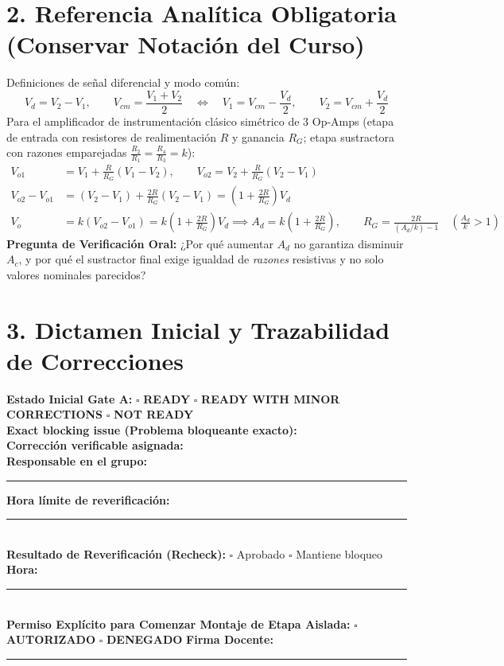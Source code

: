 \documentclass[10pt, a4paper]{article}
\begin{document}
\section*{2. Referencia Analítica Obligatoria (Conservar Notación del Curso)}
Definiciones de señal diferencial y modo común:
\begin{equation*}
    V_d = V_2 - V_1, \qquad V_{cm} = \frac{V_1 + V_2}{2} \quad \Longleftrightarrow \quad V_1 = V_{cm} - \frac{V_d}{2}, \qquad V_2 = V_{cm} + \frac{V_d}{2}
\end{equation*}
Para el amplificador de instrumentación clásico simétrico de 3 Op-Amps (etapa de entrada con resistores de realimentación $R$ y ganancia $R_G$; etapa sustractora con razones emparejadas $\frac{R_2}{R_1} = \frac{R_4}{R_3} = k$):
\begin{align*}
    V_{o1} &= V_1 + \frac{R}{R_G}(V_1 - V_2), \qquad V_{o2} = V_2 + \frac{R}{R_G}(V_2 - V_1) \\
    V_{o2} - V_{o1} &= (V_2 - V_1) + \frac{2R}{R_G}(V_2 - V_1) = \left(1 + \frac{2R}{R_G}\right)V_d \\
    V_o &= k(V_{o2} - V_{o1}) = k\left(1 + \frac{2R}{R_G}\right)V_d \implies \boxed{A_d = k\left(1 + \frac{2R}{R_G}\right)}, \qquad \boxed{R_G = \frac{2R}{(A_d/k) - 1}} \quad \left(\frac{A_d}{k} > 1\right)
\end{align*}
\textbf{Pregunta de Verificación Oral:} ¿Por qué aumentar $A_d$ no garantiza disminuir $A_c$, y por qué el sustractor final exige igualdad de \textit{razones} resistivas y no solo valores nominales parecidos?

\section*{3. Dictamen Inicial y Trazabilidad de Correcciones}
\begin{tcolorbox}[colback=white, colframe=black]
    \textbf{Estado Inicial Gate A:} \quad $\square$ \textbf{READY} \qquad $\square$ \textbf{READY WITH MINOR CORRECTIONS} \qquad $\square$ \textbf{NOT READY} \\[0.2cm]
    \textbf{Exact blocking issue (Problema bloqueante exacto):} \hrulefill \\[0.2cm]
    \textbf{Corrección verificable asignada:} \hrulefill \\[0.2cm]
    \textbf{Responsable en el grupo:} \rule{5cm}{0.4pt} \hfill \textbf{Hora límite de reverificación:} \rule{3.5cm}{0.4pt} \\[0.2cm]
    \textbf{Resultado de Reverificación (Recheck):} $\square$ Aprobado \quad $\square$ Mantiene bloqueo \hfill \textbf{Hora:} \rule{2.5cm}{0.4pt} \\[0.2cm]
    \textbf{Permiso Explícito para Comenzar Montaje de Etapa Aislada:} $\square$ \textbf{AUTORIZADO} \quad $\square$ \textbf{DENEGADO} \hfill \textbf{Firma Docente:} \rule{3cm}{0.4pt}
\end{tcolorbox}
\end{document}
